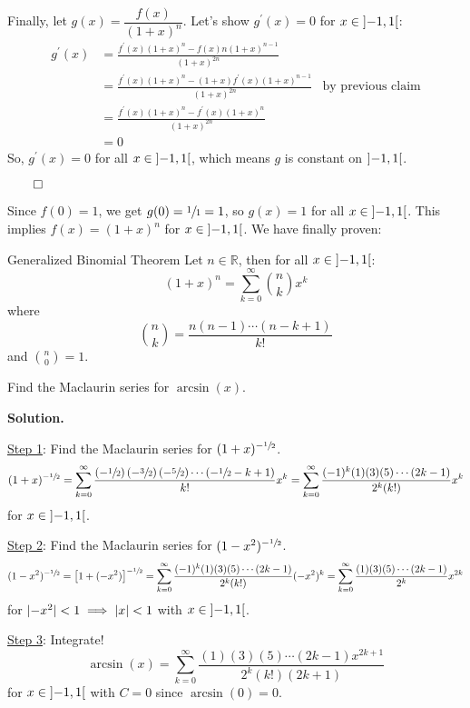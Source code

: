 Finally, let $ g(x)=\dfrac{f(x)}{(1+x)^n} $. Let's show $ g^\prime(x)=0 $
for $ x\in\interval[open]{-1}{1} $:
\begin{align*}
    g^\prime(x)
     & =\frac{f^\prime(x)(1+x)^n-f(x)n(1+x)^{n-1}}{(1+x)^{2n}}                                       \\
     & =\frac{f^\prime(x)(1+x)^n-(1+x)f^\prime(x)(1+x)^{n-1}}{(1+x)^{2n}} & \text{by previous claim} \\
     & =\frac{f^\prime(x)(1+x)^{n}-f^\prime(x)(1+x)^n}{(1+x)^{2n}}                                   \\
     & =0
\end{align*}
So, $ g^\prime(x)=0 $ for all $ x\in\interval[open]{-1}{1} $, which means
$ g $ is constant on $ \interval[open]{-1}{1} $.

$ \qed $

Since $ f(0)=1 $, we get $ g(0)=\sfrac{1}{1} =1 $, so $ g(x)=1 $
for all $ x\in\interval[open]{-1}{1} $. This implies
$ f(x)=(1+x)^n $ for $ x\in\interval[open]{-1}{1} $. We have finally proven:

\begin{Theorem}{Generalized Binomial Theorem}{}
    Let $ n\in\mathbb{R} $, then for all $ x\in\interval[open]{-1}{1} $:
    \[ (1+x)^n=
        \sum\limits_{k=0}^{\infty} \binom{n}{k}x^k \]
    where
    \[ \binom{n}{k}=\frac{n(n-1)\cdots(n-k+1)}{k!} \]
    and $ \binom{n}{0}=1 $.
\end{Theorem}

\begin{Example}{}{}
    Find the Maclaurin series for $ \arcsin(x) $.

    \textbf{Solution.}

    \underline{Step 1}: Find the Maclaurin series for $ (1+x)^{-\sfrac{1}{2}} $.
    \[ (1+x)^{-\sfrac{1}{2}}
        =\sum\limits_{k=0}^{\infty} \frac{\left( -\sfrac{1}{2} \right)\left( -\sfrac{3}{2}  \right)
            \left( -\sfrac{5}{2} \right)\cdots\left( -\sfrac{1}{2} -k +1\right)}{k!}x^k
        =\sum\limits_{k=0}^{\infty} \frac{(-1)^k(1)(3)(5)\cdots(2k-1)}{2^k (k!)}x^k   \]
    for $ x\in\interval[open]{-1}{1} $.

    \underline{Step 2}: Find the Maclaurin series for $ (1-x^2)^{-\sfrac{1}{2} } $.
    \[ (1-x^2)^{-\sfrac{1}{2}}
        =\left[ 1+(-x^2) \right]^{-\sfrac{1}{2}}
        =\sum\limits_{k=0}^{\infty} \frac{(-1)^k(1)(3)(5)\cdots(2k-1)}{2^k (k!)}(-x^2)^k
        =\sum\limits_{k=0}^{\infty} \frac{(1)(3)(5)\cdots(2k-1)}{2^k}x^{2k}  \]
    for $ \lvert-x^2\rvert<1\implies\lvert x\rvert<1 $ with $ x\in\interval[open]{-1}{1} $.

    \underline{Step 3}: Integrate!
    \[ \arcsin(x)
        =\sum\limits_{k=0}^{\infty}\frac{(1)(3)(5)\cdots(2k-1)x^{2k+1}}{2^k(k!)(2k+1)}   \]
    for $ x\in\interval[open]{-1}{1} $ with $ C=0 $ since $ \arcsin(0)=0 $.
\end{Example}

